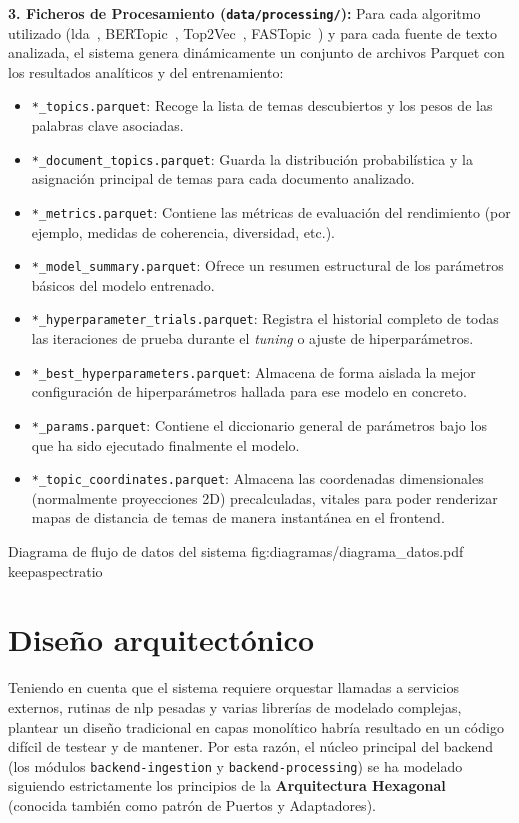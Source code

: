 \textbf{3. Ficheros de Procesamiento (\texttt{data/processing/}):}
Para cada algoritmo utilizado (\acrshort{lda}~\cite{blei2003lda}, BERTopic~\cite{QuickStartBERTopic}, Top2Vec~\cite{angelovTop2VecDistributedRepresentations2020}, FASTopic~\cite{FastopicFASTopic}) y para cada fuente de texto analizada, el sistema genera dinámicamente un conjunto de archivos Parquet con los resultados analíticos y del entrenamiento:
\begin{itemize}
    \item \texttt{*\_topics.parquet}: Recoge la lista de temas descubiertos y los pesos de las palabras clave asociadas.
    \item \texttt{*\_document\_topics.parquet}: Guarda la distribución probabilística y la asignación principal de temas para cada documento analizado.
    \item \texttt{*\_metrics.parquet}: Contiene las métricas de evaluación del rendimiento (por ejemplo, medidas de coherencia, diversidad, etc.).
    \item \texttt{*\_model\_summary.parquet}: Ofrece un resumen estructural de los parámetros básicos del modelo entrenado.
    \item \texttt{*\_hyperparameter\_trials.parquet}: Registra el historial completo de todas las iteraciones de prueba durante el \textit{tuning} o ajuste de hiperparámetros.
    \item \texttt{*\_best\_hyperparameters.parquet}: Almacena de forma aislada la mejor configuración de hiperparámetros hallada para ese modelo en concreto.
    \item \texttt{*\_params.parquet}: Contiene el diccionario general de parámetros bajo los que ha sido ejecutado finalmente el modelo.
    \item \texttt{*\_topic\_coordinates.parquet}: Almacena las coordenadas dimensionales (normalmente proyecciones 2D) precalculadas, vitales para poder renderizar mapas de distancia de temas de manera instantánea en el frontend.
\end{itemize}

{Diagrama de flujo de datos del sistema}
{fig:diagramas/diagrama_datos.pdf}
{keepaspectratio}

\section{Diseño arquitectónico}
Teniendo en cuenta que el sistema requiere orquestar llamadas a servicios
externos, rutinas de \acrshort{nlp} pesadas y varias librerías de modelado
complejas, plantear un diseño tradicional en capas monolítico habría resultado
en un código difícil de testear y de mantener. Por esta razón, el núcleo
principal del backend (los módulos \texttt{backend-ingestion} y
\texttt{backend-processing}) se ha modelado siguiendo estrictamente los
principios de la \textbf{Arquitectura
    Hexagonal}~\cite{HexagonalArchitectureClean2022} (conocida también como patrón
de Puertos y Adaptadores).

